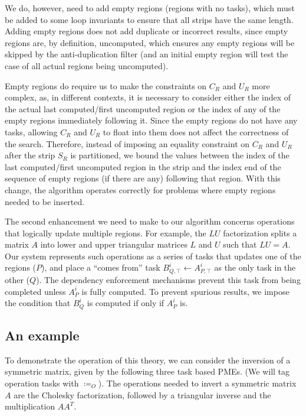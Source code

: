 \documentclass[12pt,letterpaper]{article}
\begin{document}
We do, however, need to add empty regions (regions with no tasks), which must be added to some loop invariants to ensure that all strips have the same length.
Adding empty regions does not add duplicate or incorrect results, since empty regions are, by definition, uncomputed, which ensures any empty regions will be skipped by the anti-duplication filter (and an initial empty region will test the case of all actual regions being uncomputed).

Empty regions do require us to make the constraints on $C_R$ and $U_R$ more complex, as, in different contexts, it is necessary to consider either the index of the actual last computed/first uncomputed region or the index of any of the empty regions immediately following it.
Since the empty regions do not have any tasks, allowing $C_R$ and $U_R$ to float into them does not affect the correctness of the search.
Therefore, instead of imposing an equality constraint on $C_R$ and $U_R$ after the strip $S_R$ is partitioned, we bound the values between the index of the last computed/first uncomputed region in the strip and the index end of the sequence of empty regions (if there are any) following that region.
With this change, the algorithm operates correctly for problems where empty regions needed to be inserted.

The second enhancement we need to make to our algorithm concerns operations that logically update multiple regions.
For example, the $LU$ factorization splits a matrix $A$ into lower and upper triangular matrices $L$ and $U$ such that $LU = A$.
Our system represents such operations as a series of tasks that updates one of the regions ($P$), and place a ``comes from'' task $B^i_{Q, \top} \leftarrow A^i_{P, \top}$ as the only task in the other ($Q$).
The dependency enforcement mechanisms prevent this task from being completed unless $A^i_P$ is fully computed.
To prevent spurious results, we impose the condition that $B^i_Q$ is computed if only if $A^i_P$ is.

\subsection{An example}
To demonstrate the operation of this theory, we can consider the inversion of a symmetric matrix, given by the following three task based PMEs. (We will tag operation tasks with $\coloneqq_O$).
The operations needed to invert a symmetric matrix $A$ are the Cholesky factorization, followed by a triangular inverse and the multiplication $AA^{T}$.
\end{document}
